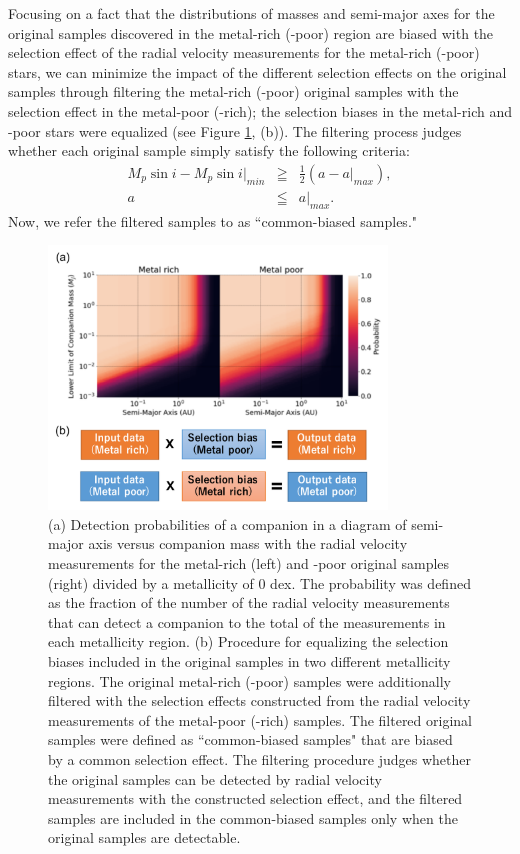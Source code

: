 \documentclass[twocolumn, dvipdfmx]{aastex62}
\begin{document}
\begin{CJK*}{UTF8}{min}
Focusing on a fact that the distributions of masses and semi-major axes for the original samples discovered in the metal-rich (-poor) region are biased with the selection effect of the radial velocity measurements for the metal-rich (-poor) stars, we can minimize the impact of the different selection effects on the original samples through filtering the metal-rich (-poor) original samples with the selection effect in the metal-poor (-rich); the selection biases in the metal-rich and -poor stars were equalized (see Figure \ref{fig:bias}, (b)). The filtering process judges whether each original sample simply satisfy the following criteria:
\begin{eqnarray}
M_p\sin{i}-M_p\sin{i}|_{min} &\geqq& \frac{1}{2}(a-a|_{max}) , \\
a &\leqq& a|_{max} .
\end{eqnarray}
Now, we refer the filtered samples to as ``common-biased samples."

\begin{figure}[t]
\begin{center}
\includegraphics[width=9cm]{../../../Figure/selection_bias.pdf}
\caption{(a) Detection probabilities of a companion in a diagram of semi-major axis versus companion mass with the radial velocity measurements for the metal-rich (left) and -poor original samples (right) divided by a metallicity of 0 dex. The probability was defined as the fraction of the number of the radial velocity measurements that can detect a companion to the total of the measurements in each metallicity region. (b) Procedure for equalizing the selection biases included in the original samples in two different metallicity regions. The original metal-rich (-poor) samples were additionally filtered with the selection effects constructed from the radial velocity measurements of the metal-poor (-rich) samples. The filtered original samples were defined as ``common-biased samples" that are biased by a common selection effect. The filtering procedure judges whether the original samples can be detected by radial velocity measurements with the constructed selection effect, and the filtered samples are included in the common-biased samples only when the original samples are detectable. \label{fig:bias}}
\end{center}
\end{figure}



\end{CJK*}
\end{document}
